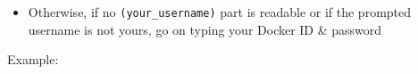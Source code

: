 \documentclass[handout]{beamer}\mode<presentation>{\usetheme{AMSCesenaBleu}}
\begin{document}
\begin{frame}[allowframebreaks]
\begin{enumerate}
\begin{itemize}
\begin{itemize}
            \item Otherwise, if no \texttt{(\alert{your\_username})} part is readable or if the prompted username is not yours, go on typing your Docker ID \& password
        \end{itemize}
    \end{itemize}
    \framebreak
    Example:
    \vspace{.3cm}
	\end{enumerate}

\end{frame}
\end{document}
